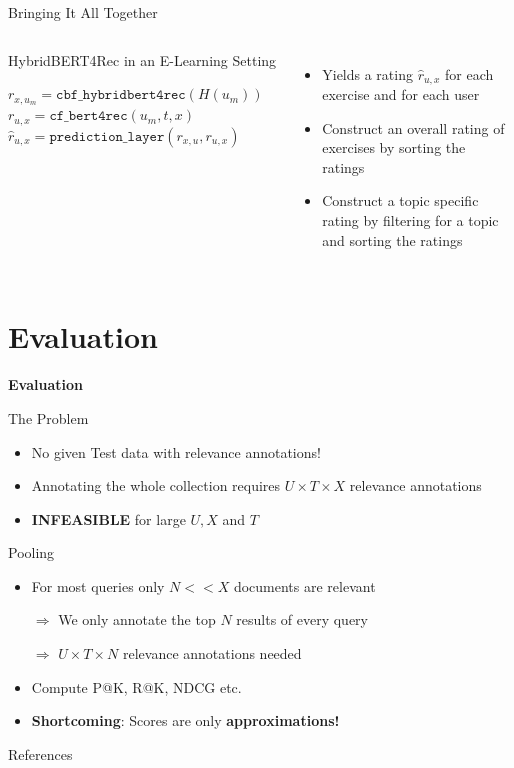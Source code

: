 \documentclass[en]{sdqbeamer}
\begin{document}
\begin{frame}{Bringing It All Together}
	\begin{columns}
		\begin{algorithm}[H]
			\caption{HybridBERT4Rec in an E-Learning Setting}
			\begin{algorithmic}[1]
					\State $r_{x,u_m} = \texttt{cbf\_hybridbert4rec}(H(u_m))$
						\State $r_{u, x} = \texttt{cf\_bert4rec}(u_m,t,x)$
						\State $\hat{r}_{u,x} = \texttt{prediction\_layer}(r_{x,u}, r_{u,x})$
					\EndFor
				\EndFor
			\end{algorithmic}
		\end{algorithm}
		\begin{itemize}
			\item Yields a rating $\hat{r}_{u,x}$ for each exercise and for each user
			\item Construct an overall rating of exercises by sorting the ratings
			\item Construct a topic specific rating by filtering for a topic and sorting the ratings
		\end{itemize}
	\end{columns}
\end{frame}

\section{Evaluation}
\begin{frame}
	\centering\textbf{\LARGE{Evaluation}}
\end{frame}
\begin{frame}{The Problem}
	\begin{itemize}
		\item No given Test data with relevance annotations!
		\item Annotating the whole collection requires $U \times T \times X$ relevance annotations
		\item \textbf{INFEASIBLE} for large $U, X$ and $T$
	\end{itemize}
\end{frame}
\begin{frame}{Pooling}
	\begin{itemize}
		\item For most queries only $N << X$ documents are relevant
		\item[$\Rightarrow$] We only annotate the top $N$ results of every query
		\item[$\Rightarrow$] $U \times T \times N$ relevance annotations needed
		\item Compute P@K, R@K, NDCG etc.
		\item \textbf{Shortcoming}: Scores are only \textbf{approximations!}
	\end{itemize}
\end{frame}

\appendix
\beginbackup
\begin{frame}{References}
	\printbibliography
\end{frame}

\backupend
\end{document}
